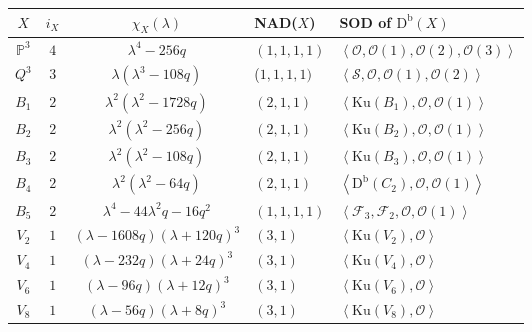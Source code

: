 \documentclass[11pt]{amsart}
\theoremstyle{plain}
\numberwithin{equation}{section}
\theoremstyle{definition}
\theoremstyle{remark}
\newcommand{\sheaf}[1]{\mathscr{#1}}
\newcommand{\OO}{\sheaf{O}}
\newcommand{\Db}{\mathrm{D}^{\mathrm{b}}}
\newcommand{\Ku}{\mathrm{Ku}}
\begin{document}
\begin{table}[htbp]
\centering
\renewcommand{\arraystretch}{1.35}
\setlength{\tabcolsep}{3.5pt}

\begin{tabularx}{\textwidth}{@{} c c c >{\centering\arraybackslash}p{} X @{}}
\toprule
$X$ & $i_X$ & $\chi_X(\lambda)$ & NAD($X$) & SOD of $\Db(X)$ \\
\midrule

$\mathbb{P}^3$ & $4$ &
$\lambda^4 - 256q$ & $(1,1,1,1)$ & 
$\left\langle \OO,\OO(1),\OO(2),\OO(3) \right\rangle$ \\

\midrule

$Q^3$ & $3$ &
$\lambda(\lambda^3 - 108q)$ & ($1,1, 1,1)$ &
$\left\langle \mathcal S,\OO,\OO(1), \OO(2) \right\rangle$ \\

\midrule

$B_1$ & $2$ &
$\lambda^2(\lambda^2 - 1728q)$ & $(2,1,1)$ & 
$\left\langle \Ku(B_1),\OO,\OO(1) \right\rangle$ \\

$B_2$ & $2$ &
$\lambda^2(\lambda^2 - 256q)$ & $(2,1,1)$ & 
$\left\langle \Ku(B_2),\OO,\OO(1) \right\rangle$ \\

$B_3$ & $2$ &
$\lambda^2(\lambda^2 - 108q)$ & $(2,1,1)$ &
$\left\langle \Ku(B_3),\OO,\OO(1) \right\rangle$ \\

$B_4$ & $2$ &
$\lambda^2(\lambda^2 - 64q)$ & $(2,1,1)$ & 
$\left\langle \Db(C_2),\OO,\OO(1) \right\rangle$ \\

$B_5$ & $2$ &
$\lambda^4 - 44\lambda^2 q - 16q^2$ & $(1,1,1,1)$ &
$\left\langle \mathcal F_3,\mathcal F_2,\OO,\OO(1) \right\rangle$ \\

\midrule

$V_2$ & $1$ &
$(\lambda - 1608q)(\lambda + 120q)^3$ & $(3,1)$ & 
$\left\langle \Ku(V_2),\OO \right\rangle$ \\

$V_4$ & $1$ &  
$(\lambda - 232q)(\lambda + 24q)^3$ & $(3,1)$ & 
$\left\langle \Ku(V_4),\OO \right\rangle$ \\

$V_6$ & $1$  &
$(\lambda - 96q)(\lambda + 12q)^3$ & $(3,1)$ & 
$\left\langle \Ku(V_6),\OO \right\rangle$ \\

$V_8$ & $1$ &
$(\lambda - 56q)(\lambda + 8q)^3$ & $(3,1)$ & 
$\left\langle \Ku(V_8),\OO \right\rangle$ \\


\end{tabularx}
\end{table}
\end{document}
